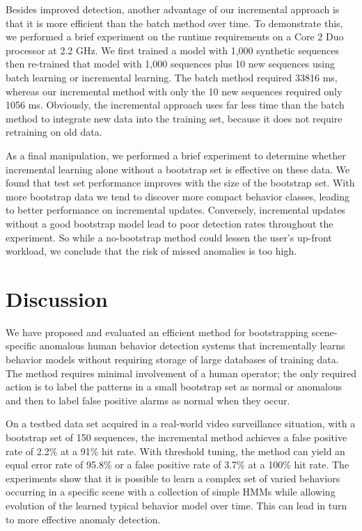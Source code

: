 Besides improved detection, another advantage of our incremental
approach is that it is more efficient than the batch method over time.
To demonstrate this, we performed a brief experiment on the runtime
requirements on a Core 2 Duo processor at 2.2 GHz. We first trained a
model with 1,000 synthetic sequences then re-trained that model with
1,000 sequences plus 10 new sequences using batch learning or
incremental learning. The batch method required 33816 ms, whereas our
incremental method with only the 10 new sequences required only 1056
ms. Obviously, the incremental approach uses far less time than the
batch method to integrate new data into the training set, because it
does not require retraining on old data.

As a final manipulation, we performed a brief experiment to determine
whether incremental learning alone without a bootstrap set is
effective on these data.  We found that test set performance improves
with the size of the bootstrap set.  With more bootstrap data we tend
to discover more compact behavior classes, leading to better
performance on incremental updates. Conversely, incremental updates
without a good bootstrap model lead to poor detection rates throughout
the experiment. So while a no-bootstrap method could lessen the user's
up-front workload, we conclude that the risk of missed anomalies is
too high.

\section{Discussion}
\label{incremental-conclusion}

We have proposed and evaluated an efficient method for bootstrapping
scene-specific anomalous human behavior detection systems that
incrementally learns behavior models without requiring storage of
large databases of training data. The method requires minimal
involvement of a human operator; the only required action is to label
the patterns in a small bootstrap set as normal or anomalous and then
to label false positive alarms as normal when they occur.

On a testbed data set acquired in a real-world video
surveillance situation, with a bootstrap set of 150 sequences,
the incremental method achieves a false positive rate of 2.2\% at a
91\% hit rate.  With threshold tuning, the method can yield an equal
error rate of 95.8\% or a false positive rate of 3.7\% at a 100\% hit
rate. The experiments show that it is possible to learn a complex set
of varied behaviors occurring in a specific scene with a collection of
simple HMMs while allowing evolution of the learned typical behavior
model over time.  This can lead in turn to more effective anomaly
detection.

